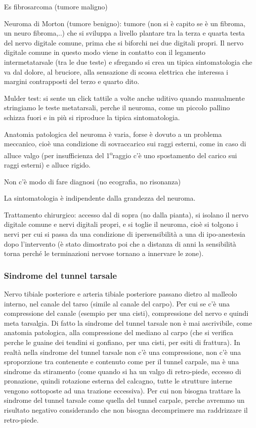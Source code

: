 Es fibrosarcoma (tumore maligno)

Neuroma di Morton (tumore benigno): tumore (non si è capito se è un fibroma, un neuro fibroma,..) che si sviluppa a livello plantare tra la terza e quarta testa del nervo digitale comune, prima che si biforchi nei due digitali propri. Il nervo digitale comune in questo modo viene in contatto con il legamento intermetatarsale (tra le due teste) e sfregando si crea un tipica sintomatologia che va dal dolore, al bruciore, alla sensazione di scossa elettrica che interessa i margini
contrapposti del terzo e quarto dito.

Mulder test: si sente un click tattile a volte anche uditivo quando manualmente stringiamo le teste metatarsali, perche il neuroma, come un piccolo pallino schizza fuori e in più si riproduce la tipica sintomatologia.

Anatomia patologica del neuroma è varia, forse è dovuto a un problema meccanico, cioè una condizione di sovraccarico sui raggi esterni, come in caso di alluce valgo (per insufficienza del 1\textsuperscript{o}raggio c'è uno spostamento del carico sui raggi esterni) e alluce rigido.

Non c'è modo di fare diagnosi (no ecografia, no risonanza)

La sintomatologia è indipendente dalla grandezza del neuroma.

Trattamento chirurgico: accesso dal di sopra (no dalla pianta), si isolano il nervo digitale comune e nervi digitali propri, e si toglie il neuroma, cioè si tolgono i nervi per cui si passa da una condizione di
ipersensibilità a una di ipo-anestesia dopo l'intervento (è stato dimostrato poi che a distanza di anni la sensibilità torna perché le terminazioni nervose tornano a innervare le zone).

\subsubsection{Sindrome del tunnel tarsale}

Nervo tibiale posteriore e arteria tibiale posteriore passano dietro al malleolo interno, nel canale del tarso (simile al canale del carpo). Per cui se c'è una compressione del canale (esempio per una cisti),
compressione del nervo e quindi meta tarsalgia. Di fatto la sindrome del tunnel tarsale non è mai ascrivibile, come anatomia patologica, alla compressione del mediano al carpo (che si verifica perche le guaine dei tendini si gonfiano, per una cisti, per esiti di frattura). In realtà nella sindrome del tunnel tarsale non c'è una compressione, non c'è una sproporzione tra contenente e contenuto come per il tunnel carpale, ma è una sindrome da stiramento (come quando si ha un valgo di retro-piede,
eccesso di pronazione, quindi rotazione esterna del calcagno, tutte le strutture interne vengono sottoposte ad una trazione eccessiva). Per cui non bisogna trattare la sindrome del tunnel tarsale come quella del tunnel carpale, perche avremmo un risultato negativo considerando che non bisogna decomprimere ma raddrizzare il retro-piede.

